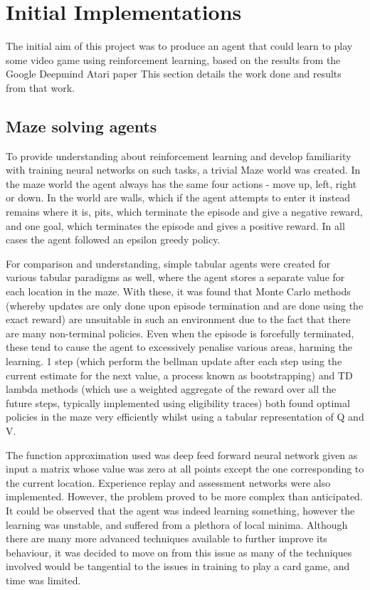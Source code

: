 \section{Initial Implementations}
The initial aim of this project was to produce an agent that could learn to play some video game using reinforcement learning, based on the results from the Google Deepmind Atari paper \cite{atariDQN} %
This section details the work done and results from that work.
\subsection{Maze solving agents}
To provide understanding about reinforcement learning and develop familiarity with training neural networks on such tasks, a trivial Maze world was created. In the maze world the agent always has the same four actions - move up, left, right or down. In the world are walls, which if the agent attempts to enter it instead remains where it is, pits, which terminate the episode and give a negative reward, and one goal, which terminates the episode and gives a positive reward.
In all cases the agent followed an epsilon greedy policy.

For comparison and understanding, simple tabular agents were created for various tabular paradigms as well, where the agent stores a separate value for each location in the maze. With these, it was found that Monte Carlo methods (whereby updates are only done upon episode termination and are done using the exact reward) are unsuitable in such an environment due to the fact that there are many non-terminal policies. Even when the episode is forcefully terminated, these tend to cause the agent to excessively penalise various areas, harming the learning. 1 step (which perform the bellman update after each step using the current estimate for the next value, a process known as bootstrapping) and TD lambda methods (which use a weighted aggregate of the reward over all the future steps, typically implemented using eligibility traces) both found optimal policies in the maze very efficiently whilst using a tabular representation of Q and V.


The function approximation used was deep feed forward neural network given as input a matrix whose value was zero at all points except the one corresponding to the current location. Experience replay and assessment networks were also implemented. However, the problem proved to be more complex than anticipated. It could be observed that the agent was indeed learning something, however the learning was unstable, and suffered from a plethora of local minima. Although there are many more advanced techniques available to further improve its behaviour, it was decided to move on from this issue as many of the techniques involved would be tangential to the issues in training to play a card game, and time was limited.